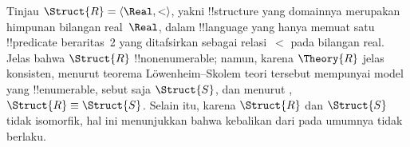 \documentclass[../../../include/open-logic-section]{subfiles}
\begin{document}
\begin{rem}
  Tinjau $\Struct{R} = \langle\Real, <\rangle$, yakni !!{structure} yang
  domainnya merupakan himpunan bilangan real~$\Real$, dalam !!{language}
  yang hanya memuat satu !!{predicate} beraritas~2 yang ditafsirkan sebagai
  relasi~$<$ pada bilangan real. Jelas bahwa $\Struct{R}$
  !!{nonenumerable}; namun, karena $\Theory{R}$ jelas konsisten, menurut
  teorema L\"owenheim--Skolem teori tersebut mempunyai model yang
  !!{enumerable}, sebut saja $\Struct{S}$, dan menurut ,
  $\Struct{R} \equiv \Struct{S}$. Selain itu, karena $\Struct{R}$ dan
  $\Struct{S}$ tidak isomorfik, hal ini menunjukkan bahwa kebalikan dari
   pada umumnya tidak berlaku.
\end{rem}
\end{document}
